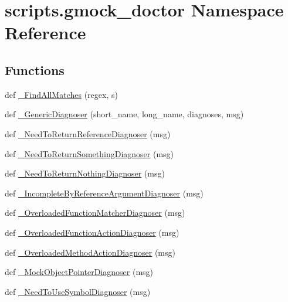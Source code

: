 \hypertarget{namespacescripts_1_1gmock__doctor}{}\section{scripts.\+gmock\+\_\+doctor Namespace Reference}
\label{namespacescripts_1_1gmock__doctor}
\subsection*{Functions}
\begin{DoxyCompactItemize}
\item 
def \mbox{\hyperlink{namespacescripts_1_1gmock__doctor_a0c2de0f6719fa2f238d319a8a0a21db4}{\+\_\+\+Find\+All\+Matches}} (regex, s)
\item 
def \mbox{\hyperlink{namespacescripts_1_1gmock__doctor_a54b9fcec8897c51a3b59d511bcf9776c}{\+\_\+\+Generic\+Diagnoser}} (short\+\_\+name, long\+\_\+name, diagnoses, msg)
\item 
def \mbox{\hyperlink{namespacescripts_1_1gmock__doctor_aab9ccefd6d382282e8157050fa78263f}{\+\_\+\+Need\+To\+Return\+Reference\+Diagnoser}} (msg)
\item 
def \mbox{\hyperlink{namespacescripts_1_1gmock__doctor_a137c363aa051ead573700a3224a42a64}{\+\_\+\+Need\+To\+Return\+Something\+Diagnoser}} (msg)
\item 
def \mbox{\hyperlink{namespacescripts_1_1gmock__doctor_a552e21b6fc3015296d7e696f3a8db0da}{\+\_\+\+Need\+To\+Return\+Nothing\+Diagnoser}} (msg)
\item 
def \mbox{\hyperlink{namespacescripts_1_1gmock__doctor_a2c19af7093263cceceb841c51caff9dd}{\+\_\+\+Incomplete\+By\+Reference\+Argument\+Diagnoser}} (msg)
\item 
def \mbox{\hyperlink{namespacescripts_1_1gmock__doctor_a19cab9d6e40b95aac3aa28304b313839}{\+\_\+\+Overloaded\+Function\+Matcher\+Diagnoser}} (msg)
\item 
def \mbox{\hyperlink{namespacescripts_1_1gmock__doctor_aad7e3ce8270d754a0dc380ff4e6dcefe}{\+\_\+\+Overloaded\+Function\+Action\+Diagnoser}} (msg)
\item 
def \mbox{\hyperlink{namespacescripts_1_1gmock__doctor_a3cb82cb73c54433d6b5e5f9380546eac}{\+\_\+\+Overloaded\+Method\+Action\+Diagnoser}} (msg)
\item 
def \mbox{\hyperlink{namespacescripts_1_1gmock__doctor_aadd56fe5bdde0bbd24d43518b3ae4d86}{\+\_\+\+Mock\+Object\+Pointer\+Diagnoser}} (msg)
\item 
def \mbox{\hyperlink{namespacescripts_1_1gmock__doctor_a6c5502e6b1cf3d5f8ca7943c4c82d086}{\+\_\+\+Need\+To\+Use\+Symbol\+Diagnoser}} (msg)

\end{DoxyCompactItemize}
